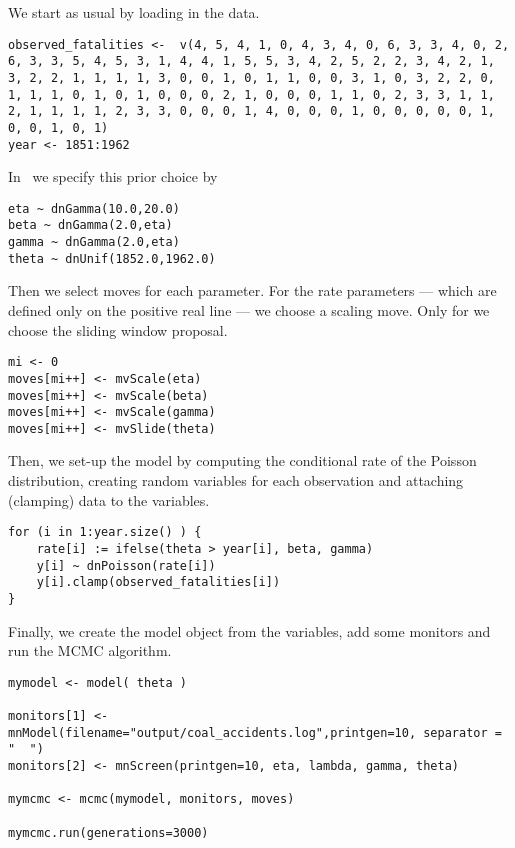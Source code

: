 We start as usual by loading in the data.
{\tt \begin{snugshade*}
\begin{lstlisting} 
observed_fatalities <-  v(4, 5, 4, 1, 0, 4, 3, 4, 0, 6, 3, 3, 4, 0, 2, 6, 3, 3, 5, 4, 5, 3, 1, 4, 4, 1, 5, 5, 3, 4, 2, 5, 2, 2, 3, 4, 2, 1, 3, 2, 2, 1, 1, 1, 1, 3, 0, 0, 1, 0, 1, 1, 0, 0, 3, 1, 0, 3, 2, 2, 0, 1, 1, 1, 0, 1, 0, 1, 0, 0, 0, 2, 1, 0, 0, 0, 1, 1, 0, 2, 3, 3, 1, 1, 2, 1, 1, 1, 1, 2, 3, 3, 0, 0, 0, 1, 4, 0, 0, 0, 1, 0, 0, 0, 0, 0, 1, 0, 0, 1, 0, 1)
year <- 1851:1962
\end{lstlisting}
\end{snugshade*}}
In \Rev~we specify this prior choice by
{\tt \begin{snugshade*}
\begin{lstlisting} 
eta ~ dnGamma(10.0,20.0)
beta ~ dnGamma(2.0,eta)
gamma ~ dnGamma(2.0,eta)
theta ~ dnUnif(1852.0,1962.0)
\end{lstlisting}
\end{snugshade*}}
Then we select moves for each parameter.
For the rate parameters --- which are defined only on the positive real line --- we choose a scaling move.
Only for  we choose the sliding window proposal.
{\tt \begin{snugshade*}
\begin{lstlisting} 
mi <- 0
moves[mi++] <- mvScale(eta)
moves[mi++] <- mvScale(beta)
moves[mi++] <- mvScale(gamma)
moves[mi++] <- mvSlide(theta)
\end{lstlisting}
\end{snugshade*}}
Then, we set-up the model by computing the conditional rate of the Poisson distribution, creating random variables for each observation and attaching (clamping) data to the variables.
{\tt \begin{snugshade*}
\begin{lstlisting} 
for (i in 1:year.size() ) {
    rate[i] := ifelse(theta > year[i], beta, gamma)
    y[i] ~ dnPoisson(rate[i])
    y[i].clamp(observed_fatalities[i])
}
\end{lstlisting}
\end{snugshade*}}
Finally, we create the model object from the variables, add some monitors and run the MCMC algorithm.
{\tt \begin{snugshade*}
\begin{lstlisting} 
mymodel <- model( theta )

monitors[1] <- mnModel(filename="output/coal_accidents.log",printgen=10, separator = "	")
monitors[2] <- mnScreen(printgen=10, eta, lambda, gamma, theta)

mymcmc <- mcmc(mymodel, monitors, moves)

mymcmc.run(generations=3000)
\end{lstlisting}
\end{snugshade*}}




